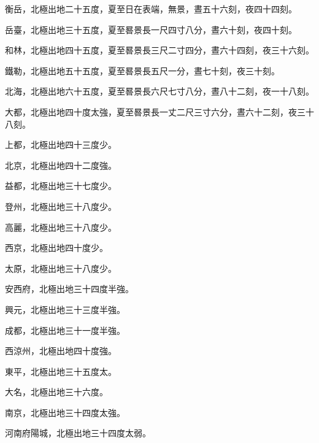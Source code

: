 \begin{pinyinscope}
 衡岳，北極出地二十五度，夏至日在表端，無景，晝五十六刻，夜四十四刻。



 岳臺，北極出地三十五度，夏至晷景長一尺四寸八分，晝六十刻，夜四十刻。



 和林，北極出地四十五度，夏至晷景長三尺二寸四分，晝六十四刻，夜三十六刻。



 鐵勒，北極出地五十五度，夏至晷景長五尺一分，晝七十刻，夜三十刻。



 北海，北極出地六十五度，夏至晷景長六尺七寸八分，晝八十二刻，夜一十八刻。



 大都，北極出地四十度太強，夏至晷景長一丈二尺三寸六分，晝六十二刻，夜三十八刻。



 上都，北極出地四十三度少。



 北京，北極出地四十二度強。



 益都，北極出地三十七度少。



 登州，北極出地三十八度少。



 高麗，北極出地三十八度少。



 西京，北極出地四十度少。



 太原，北極出地三十八度少。



 安西府，北極出地三十四度半強。



 興元，北極出地三十三度半強。



 成都，北極出地三十一度半強。



 西涼州，北極出地四十度強。



 東平，北極出地三十五度太。



 大名，北極出地三十六度。



 南京，北極出地三十四度太強。



 河南府陽城，北極出地三十四度太弱。




\end{pinyinscope}
